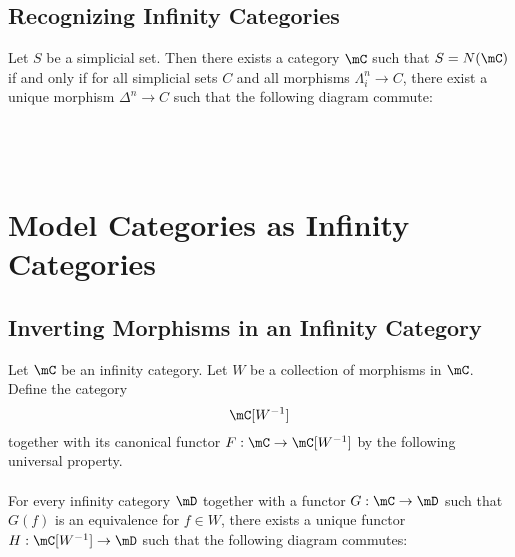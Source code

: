 \documentclass[a4paper]{article}
\begin{document}
\subsection{Recognizing Infinity Categories}
\begin{prp}{}{} Let $S$ be a simplicial set. Then there exists a category $\mC$ such that $S=N(\mC)$ if and only if for all simplicial sets $C$ and all morphisms $\Lambda_i^n\to C$, there exist a unique morphism $\Delta^n\to C$ such that the following diagram commute: \\~\\
\\~\\
\end{prp}

\pagebreak
\section{Model Categories as Infinity Categories}
\subsection{Inverting Morphisms in an Infinity Category}
\begin{defn}{}{} Let $\mC$ be an infinity category. Let $W$ be a collection of morphisms in $\mC$. Define the category $$\mC[W^{-1}]$$ together with its canonical functor $F:\mC\to\mC[W^{-1}]$ by the following universal property. \\~\\

For every infinity category $\mD$ together with a functor $G:\mC\to\mD$ such that $G(f)$ is an equivalence for $f\in W$, there exists a unique functor $H:\mC[W^{-1}]\to\mD$ such that the following diagram commutes: \\~\\
\\~\\
\end{defn}
\end{document}
